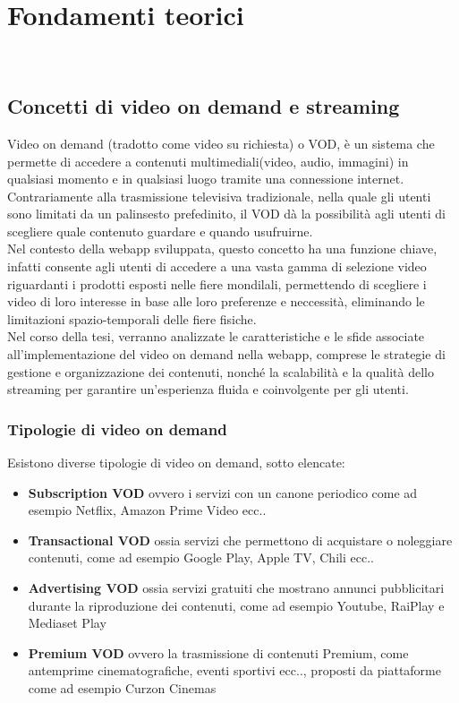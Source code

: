 \chapter{Fondamenti teorici}

\\

\section{Concetti di video on demand e streaming}
Video on demand (tradotto come video su richiesta) o VOD, è un sistema che permette di accedere a contenuti multimediali(video, audio, immagini) 
in qualsiasi momento e in qualsiasi luogo tramite una connessione internet.
Contrariamente alla trasmissione televisiva tradizionale, nella quale gli utenti sono limitati da un palinsesto prefedinito, 
il VOD dà la possibilità agli utenti di scegliere quale contenuto guardare e quando usufruirne.\\
Nel contesto della webapp sviluppata, questo concetto ha una funzione chiave, infatti consente agli utenti di accedere a una vasta gamma di selezione video riguardanti 
i prodotti esposti nelle fiere mondilali, 
permettendo di scegliere i video di loro interesse in base alle loro preferenze e neccessità, eliminando le limitazioni spazio-temporali delle fiere fisiche.\\
Nel corso della tesi, verranno analizzate le caratteristiche e le sfide associate all'implementazione del video on demand nella webapp, comprese le strategie 
di gestione e organizzazione dei contenuti, nonché la scalabilità e la qualità dello streaming per garantire un'esperienza fluida e coinvolgente per gli utenti.
\subsection{Tipologie di video on demand}
Esistono diverse tipologie di video on demand, sotto elencate:

\begin{itemize}
    \item \textbf{Subscription VOD} ovvero i servizi con un canone periodico come ad esempio Netflix, Amazon Prime Video ecc..\\
    \item \textbf{Transactional VOD} ossia servizi che permettono di acquistare o noleggiare contenuti, come ad esempio Google Play, Apple TV, Chili ecc..\\
    \item \textbf{Advertising VOD} ossia servizi gratuiti che mostrano annunci pubblicitari durante la riproduzione dei contenuti, come ad esempio Youtube, RaiPlay e Mediaset Play\\
    \item \textbf{Premium VOD} ovvero la trasmissione di contenuti Premium, come antemprime cinematografiche, eventi sportivi ecc.., proposti da piattaforme come ad esempio Curzon Cinemas\\
\end{itemize}

